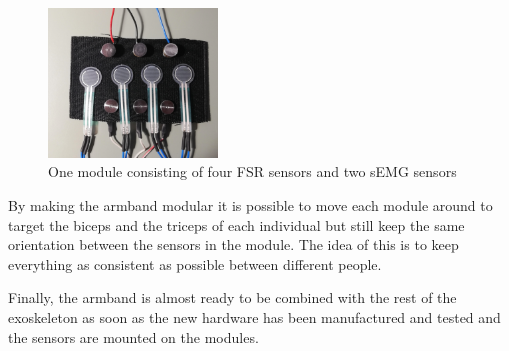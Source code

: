 \begin{figure}[htbp]
    \centering
    \includegraphics[width=0.4\textwidth]{figures/one_module.jpg}
    \caption{One module consisting of four FSR sensors and two sEMG sensors}
    \label{fig:onmodule}
\end{figure}

By making the armband modular it is possible to move each module around to target the biceps and the triceps of each individual but still keep the same orientation between the sensors in the module. The idea of this is to keep everything as consistent as possible between different people. 


Finally, the armband is almost ready to be combined with the rest of the exoskeleton as soon as the new hardware has been manufactured and tested and the sensors are mounted on the modules.

